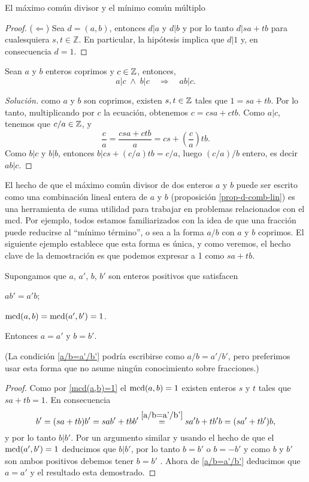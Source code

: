 \begin{section}{El máximo común divisor y el mínimo común múltiplo}
\begin{proof}
    ($\Leftarrow$) Sea $d = (a,b)$, entonces $d|a$ y $d|b$ y por lo tanto $d|sa+tb$ para cualesquiera   $s,t \in \mathbb Z$.  En particular, la hipótesis implica que $d | 1$ y, en consecuencia $d =1$. 
\end{proof}


\begin{ejemplo*}
    Sean $a$ y $b$ enteros coprimos y $c \in {\mathbb Z}$, entonces,
    $$
    a|c \; \wedge \; b|c  \quad \Rightarrow \quad ab|c.
    $$
\end{ejemplo*}
\begin{proof}[Solución] como $a$ y $b$ son coprimos, existen $s,t \in {\mathbb Z}$ tales que $1 = sa+tb$. Por lo tanto,  multiplicando por $c$ la ecuación,  obtenemos $c = csa + ctb$. Como $a|c$, tenemos que $c/a \in {\mathbb Z}$, y 
$$
\frac{c}{a} = \frac{csa + ctb}{a} = cs + (\frac{c}{a})tb.
$$ 
Como $b|c$ y $b|b$, entonces $b |cs +(c/a)tb =c/a$, luego $(c/a)/b$ entero,  es decir $ab|c$.     
\end{proof}

El hecho  de que el máximo común divisor de dos enteros $a$ y $b$ puede ser escrito como una combinación lineal entera de $a$ y $b$  (proposición \ref{prop-d-comb-lin}) es una herramienta de suma utilidad para trabajar en problemas relacionados con el mcd. Por ejemplo, todos estamos familiarizados con la idea de que una fracción puede reducirse al ``mínimo término'', o sea a la forma $a/b$ con $a$ y $b$ coprimos. El  siguiente ejemplo establece que esta forma es única, y como veremos, el hecho clave de la demostración es que podemos expresar
a 1 como $sa+tb$.

\begin{ejemplo*} Supongamos que $a$, $a'$, $b$, $b'$ son enteros
positivos que satisfacen
\begin{enumerate}[label=\textit{\alph*)}]
    \begin{minipage}{0.40\textwidth}
    \item\label{a/b=a'/b'} $ab'=a'b$;
    \end{minipage}
    \begin{minipage}{0.40\textwidth}
    \item\label{mcd(a,b)=1} $\operatorname{mcd}(a,b)=\operatorname{mcd}(a',b')=1$.
    \end{minipage}
\end{enumerate}    
Entonces $a=a'$ y $b=b'$.

(La condición \ref{a/b=a'/b'} podría escribirse como $a/b=a'/b'$, pero
preferimos usar esta forma que no asume ningún conocimiento sobre
fracciones.)
\end{ejemplo*}
\begin{proof} Como por \ref{mcd(a,b)=1} el $\operatorname{mcd} (a,b) =1$ existen enteros $s$ y $t$
tales que $sa+tb=1$. En consecuencia
$$
b'=(sa+tb)b' =sab'+tbb' \overset{\ref{a/b=a'/b'}}{=} sa'b + tb'b = (sa'+tb')b,
$$
y por lo tanto $b|b'$. Por un argumento similar y usando el hecho
de que el $\operatorname{mcd}(a',b')=1 $ deducimos que $b|b'$, por lo tanto
$b=b'$ o $b=-b'$ y como $b $ y $b'$ son ambos positivos debemos
tener $b=b'$ . Ahora de \ref{a/b=a'/b'} deducimos que $a=a'$ y el resultado
esta demostrado.
\end{proof}



\end{section}
